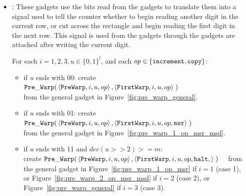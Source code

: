     \begin{itemize}

        \item {\prewarp}: These gadgets use the bits read from the {\cread} gadgets to translate them into
                          a signal used to tell the counter whether to begin reading
                          another digit in the current row, or cut across the rectangle and begin reading the
                          first digit in the next row. This signal is used from the {\prewarp} gadgets through
                          the {\dtop} gadgets are attached after writing the current digit.

            For each $i = 1,2,3, u \in \{0, 1\}^l$, and each $op \in \{ {\tt increment, copy } \}$:
            \begin{itemize}


            \item if $u$ ends with 00:
            create
            $\begin{aligned}[t]
                {\tt Pre\_Warp}(& \left\langle {\tt PreWarp},   i, u, op \right\rangle,
                           \left\langle {\tt FirstWarp}, i, u, op \right\rangle \;)
            \end{aligned}$ \\ from the general gadget in Figure~\ref{fig:pre_warp_general}.

            \item if $u$ ends with 01:
            create
            $\begin{aligned}[t]
                {\tt Pre\_Warp}(& \left\langle {\tt PreWarp},   i, u, op \right\rangle,
                           \left\langle {\tt FirstWarp}, i, u, op, {\tt msr} \right\rangle \;)
            \end{aligned}$ \\ from the general gadget in Figure~\ref{fig:pre_warp_1_op_msr_msd}.


            \item if $u$ ends with 11 and $dec(u >> 2) >= m$:\\
            create
            $\begin{aligned}[t]
                {\tt Pre\_Warp}(& \left\langle {\tt PreWarp},   i, u, op \right\rangle,
                \left\langle {\tt FirstWarp}, i, u, op, {\tt halt},  \right\rangle \;)
            \end{aligned}$ from the general gadget in Figure~\ref{fig:pre_warp_1_op_msr} if $i = 1$ (case 1),
            or Figure~\ref{fig:pre_warp_2_op_msr_msd} if $i = 2$ (case 2), or Figure~\ref{fig:pre_warp_general} if $i = 3$ (case 3).



\end{itemize}
\end{itemize}
